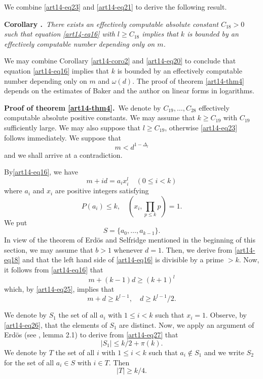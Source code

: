 We combine \eqref{art14-eq23} and \eqref{art14-eq21} to derive the following result.

\medskip
\noindent
{\bf Corollary .\label{art14-coro2}}~{\em There exists an effectively computable absolute constant $C_{18}>0$ such that equation \eqref{art14-eq16} with $l\geq C_{18}$ implies that $k$ is bounded by an effectively computable number depending only on $m$.}

We may combine Corollary \ref{art14-coro2} and \eqref{art14-eq20} to conclude that equation \eqref{art14-eq16} implies that $k$ is bounded by an effectively computable number depending only on $m$ and $\omega(d)$. The proof of theorem \ref{art14-thm4} depends on the estimates of Baker \cite{art14-key3} and the author \cite[lemma 2]{art14-key24} on linear forms in logarithms.

\medskip
\noindent
{\bf Proof of theorem \ref{art14-thm4}.}~We denote by $C_{19},\ldots,C_{28}$ effectively computable absolute positive constants. We may assume that $k\geq C_{19}$ with $C_{19}$ sufficiently large. We may also suppose that $l\geq C_{19}$, otherwise \eqref{art14-eq23} follows immediately. We suppose that
\begin{equation}
m<d^{1-\Delta_{l}}\label{art14-eq25}
\end{equation}
and we shall arrive at a contradiction.

By\pageoriginale \eqref{art14-eq16}, we have
\begin{equation}
m+id=a_{i}x^{l}_{i}\quad (0\leq i<k)\label{art14-eq26}
\end{equation}
where $a_{i}$ and $x_{i}$ are positive integers satisfying
$$
P(a_{i})\leq k,\quad \left(x_{i},\prod\limits_{p\leq k}p\right)=1.
$$
We put
$$
S=\{a_{0},\ldots,a_{k-1}\}.
$$
In view of the theorem of Erd\"os and Selfridge mentioned in the beginning of this section, we may assume that $b>1$ whenever $d=1$. Then, we derive from \eqref{art14-eq18} and \cite{art14-key34} that the left hand side of \eqref{art14-eq16} is divisible by a prime $>k$. Now, it follows from \eqref{art14-eq16} that
$$
m+(k-1)d\geq (k+1)^{l}
$$
which, by \eqref{art14-eq25}, implies that
\begin{equation}
m+d\geq k^{l-1},\quad d\geq k^{l-1}/2.\label{art14-eq27}
\end{equation}

We denote by $S_{1}$ the set of all $a_{i}$ with $1\leq i<k$ such that $x_{i}=1$. Observe, by \eqref{art14-eq26}, that the elements of $S_{1}$ are distinct. Now, we apply an argument of Erd\"os (see \cite{art14-key10}, lemma 2.1) to derive from \eqref{art14-eq27} that
$$
|S_{1}|\leq k/2+\pi (k).
$$
We denote by $T$ the set of all $i$ with $1\leq i<k$ such that $a_{i}\not\in S_{1}$ and we write $S_{2}$ for the set of all $a_{i}\in S$ with $i\in T$. Then
\begin{equation}
|T|\geq k/4.\label{art14-eq28}
\end{equation}

